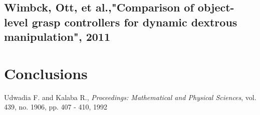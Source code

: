 \documentclass[conference]{IEEEtran}
\begin{document}

\subsection{Wimbck, Ott, et al.,"Comparison of object-level grasp controllers for dynamic dextrous manipulation", 2011}


\section{Conclusions}


%


\begin{thebibliography}{1}

Udwadia F. and Kalaba R.,
\newblock  \textit{Proceedings: Mathematical and Physical Sciences}, vol. 439, no. 1906, pp. 407 - 410, 1992



\end{thebibliography}




\end{document}
